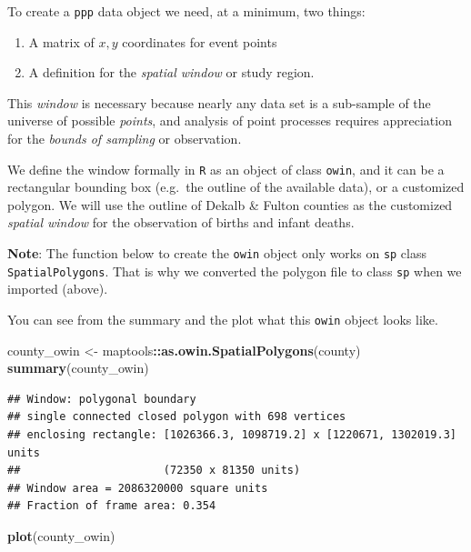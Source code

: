 \documentclass[
]{book}
\newenvironment{Shaded}{\begin{snugshade}}{\end{snugshade}}
\newcommand{\FunctionTok}[1]{\textcolor[rgb]{0.13,0.29,0.53}{\textbf{#1}}}
\newcommand{\NormalTok}[1]{#1}
\newcommand{\OtherTok}[1]{\textcolor[rgb]{0.56,0.35,0.01}{#1}}
\newcommand{\SpecialCharTok}[1]{\textcolor[rgb]{0.81,0.36,0.00}{\textbf{#1}}}
\providecommand{\tightlist}{%
  \setlength{\itemsep}{0pt}\setlength{\parskip}{0pt}}
\newenvironment{rmdnote}[1]
  {
  \begin{itemize}
  \renewcommand{\labelitemi}{
    \raisebox{-.7\height}[0pt][0pt]{
      {\setkeys{Gin}{width=3em,keepaspectratio}\texttt{[image: images/\#1]}}
    }
  }
  \setlength{\fboxsep}{1em}
  \begin{note}
  \item
  }
  {
  \end{note}
  \end{itemize}
  }
\begin{document}
To create a \texttt{ppp} data object we need, at a minimum, two things:

\begin{enumerate}
\def\labelenumi{\arabic{enumi}.}
\tightlist
\item
  A matrix of \(x,y\) coordinates for event points
\item
  A definition for the \emph{spatial window} or study region.
\end{enumerate}

This \emph{window} is necessary because nearly any data set is a sub-sample of the universe of possible \emph{points}, and analysis of point processes requires appreciation for the \emph{bounds of sampling} or observation.

We define the window formally in \texttt{R} as an object of class \texttt{owin}, and it can be a rectangular bounding box (e.g.~the outline of the available data), or a customized polygon. We will use the outline of Dekalb \& Fulton counties as the customized \emph{spatial window} for the observation of births and infant deaths.

\begin{rmdnote}{note}
\textbf{Note}:
The function below to create the \texttt{owin} object only works on \texttt{sp} class \texttt{SpatialPolygons}. That is why we converted the polygon file to class \texttt{sp} when we imported (above).

\end{rmdnote}

You can see from the summary and the plot what this \texttt{owin} object looks like.

\begin{Shaded}
\begin{Highlighting}[]
\NormalTok{county\_owin }\OtherTok{\textless{}{-}}\NormalTok{ maptools}\SpecialCharTok{::}\FunctionTok{as.owin.SpatialPolygons}\NormalTok{(county)}
\FunctionTok{summary}\NormalTok{(county\_owin)}
\end{Highlighting}
\end{Shaded}

\begin{verbatim}
## Window: polygonal boundary
## single connected closed polygon with 698 vertices
## enclosing rectangle: [1026366.3, 1098719.2] x [1220671, 1302019.3] units
##                      (72350 x 81350 units)
## Window area = 2086320000 square units
## Fraction of frame area: 0.354
\end{verbatim}

\begin{Shaded}
\begin{Highlighting}[]
\FunctionTok{plot}\NormalTok{(county\_owin)}
\end{Highlighting}
\end{Shaded}
\end{document}
